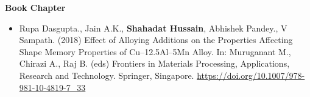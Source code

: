 \begin{cvparagraph}
\begin{itemize}
    \end{itemize}
				
\textbf{Book Chapter}			
    \begin{itemize}
    \item \textcolor{russell}{Rupa Dasgupta., Jain A.K., \textbf{Shahadat Hussain}, Abhishek Pandey., V Sampath. (2018) Effect of Alloying Additions on the Properties Affecting Shape Memory Properties of Cu–12.5Al–5Mn Alloy. In: Muruganant M., Chirazi A., Raj B. (eds) Frontiers in Materials Processing, Applications, Research and Technology. Springer, Singapore.} \url{https://doi.org/10.1007/978-981-10-4819-7_33}
    \end{itemize}
\end{cvparagraph}